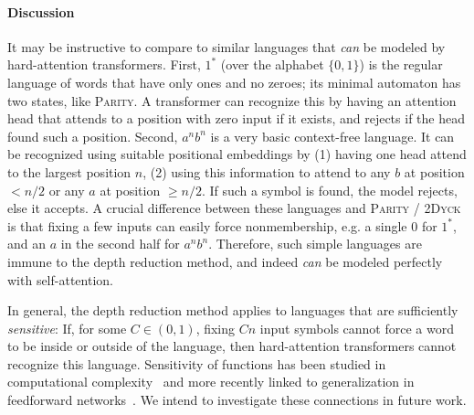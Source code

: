 \documentclass[11pt,a4paper]{article}
\begin{document}
\paragraph{Discussion}
It may be instructive to compare to similar languages that \emph{can} be modeled by hard-attention transformers.
First, $1^*$ (over the alphabet $\{0,1\}$) is the regular language of words that have only ones and no zeroes; its minimal automaton has two states, like \textsc{Parity}.
A transformer can recognize this by having an attention head that attends to a position with zero input if it exists, and rejects if the head found such a position.
Second, $a^nb^n$ is a very basic context-free language.
It can be recognized using suitable positional embeddings by (1) having one head attend to the largest position $n$, (2) using this information to attend to any $b$ at position $<n/2$ or any $a$ at position $\geq n/2$. If such a symbol is found, the model rejects, else it accepts.
A crucial difference between these languages and \textsc{Parity} / \textsc{2Dyck} is that fixing a few inputs can easily force nonmembership, e.g. a single 0 for $1^*$, and an $a$ in the second half for $a^nb^n$.
Therefore, such simple languages are immune to the depth reduction method, and indeed \emph{can} be modeled perfectly with self-attention.

In general, the depth reduction method applies to languages that are sufficiently \emph{sensitive}: If, for some $C \in (0,1)$, fixing $Cn$ input symbols cannot force a word to be inside or outside of the language, then hard-attention transformers cannot recognize this language.
Sensitivity of functions %
has been studied in computational complexity~\cite{boppana1997average,gilmer2015new,gopalan2016smooth,rossman2018average} and more recently linked to generalization in feedforward networks~\cite{de2018deep}.
We intend to investigate these connections in future work.




\end{document}
